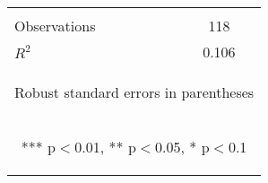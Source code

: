 \begin{center}
\begin{tabular}{lc}
\vspace{4pt} & \begin{footnotesize}\end{footnotesize} \\
Observations & 118 \\
 $R^2$ & 0.106 \\ \hline
\multicolumn{2}{c}{\begin{footnotesize} Robust standard errors in parentheses\end{footnotesize}} \\
\multicolumn{2}{c}{\begin{footnotesize} *** p$<$0.01, ** p$<$0.05, * p$<$0.1\end{footnotesize}} \\
\end{tabular}
\end{center}
